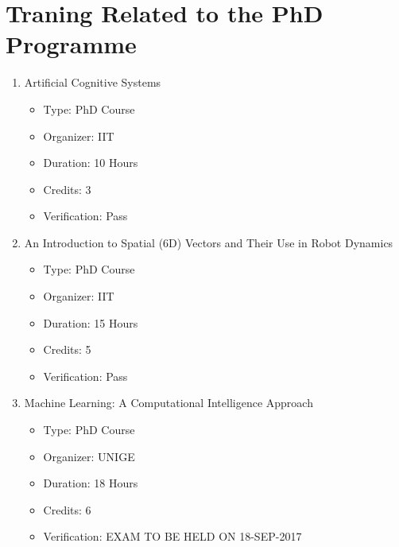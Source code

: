 \documentclass[12pt,a4paper]{report}
\begin{document}
\section{Traning Related to the PhD Programme}
\begin{enumerate}
    \item Artificial Cognitive Systems
    \begin{itemize}
		\item Type: PhD Course
		\item Organizer: IIT
		\item Duration: 10 Hours
		\item Credits: 3
		\item Verification: Pass
	\end{itemize}
	\item An Introduction to Spatial (6D) Vectors and Their Use in Robot Dynamics
	\begin{itemize}
		\item Type: PhD Course
		\item Organizer: IIT
		\item Duration: 15 Hours
		\item Credits: 5
		\item Verification: Pass
	\end{itemize}
	\item Machine Learning: A Computational Intelligence Approach
	\begin{itemize}
		\item Type: PhD Course
		\item Organizer: UNIGE
		\item Duration: 18 Hours
		\item Credits: 6
		\item Verification: EXAM TO BE HELD ON 18-SEP-2017
	\end{itemize}
\end{enumerate}
\end{document}
